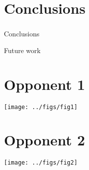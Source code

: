 \documentclass[%
]{phdpresentation}
\begin{document}
\section{Conclusions}
\begin{frame}
	\frametitle{\secname}
	\begin{block}{Conclusions}
		\blinditemize[3]
	\end{block}
	\begin{block}{Future work}
		\blinditemize[3]
	\end{block}
\end{frame}


\begin{discussion}
	
\section{Opponent 1}
\begin{questionframe}{1}
	\begin{questionblock}
		\blindquestion
	\end{questionblock}
	\begin{answerblock}
		\blindtextshort
	\end{answerblock}
\end{questionframe}

\begin{questionframe}{2}
	\begin{questionblock}
		\blindquestion
	\end{questionblock}
	\begin{answerblock}
		\blindtextshortshort
		\par
		\vspace{1em}
		\centering
		\texttt{[image: ../figs/fig1]}
	\end{answerblock}
\end{questionframe}

\section{Opponent 2}
\begin{questionframe}{1}
	\begin{questionblock}
		\blindquestion
	\end{questionblock}
	\begin{answerblock}
		\begin{center}
			\texttt{[image: ../figs/fig2]}
		\end{center}
		\vspace{1em}
		\blindtextshortshort
	\end{answerblock}
\end{questionframe}


\end{discussion}
\end{document}

